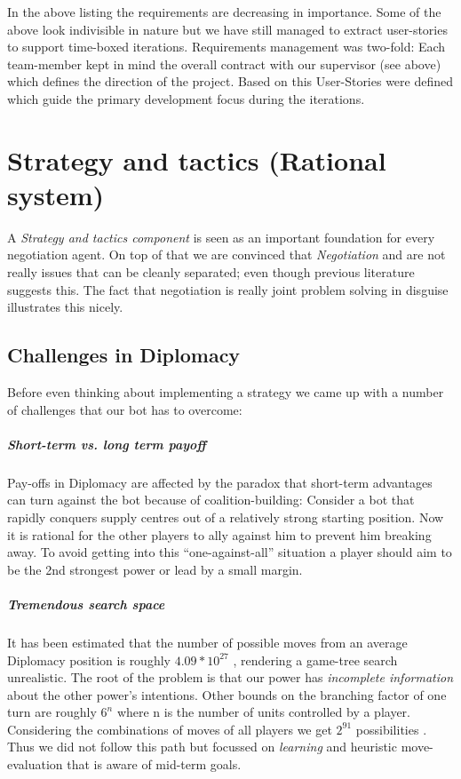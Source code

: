 \documentclass[pdftex,12pt,a4paper]{report}
\begin{document}
In the above listing the requirements are decreasing in
importance. Some of the above look indivisible in nature but we have
still managed to extract user-stories to support time-boxed
iterations. Requirements management was two-fold: Each
team-member kept in mind the overall contract with our supervisor (see
above) which defines the direction of the project.  Based on this
User-Stories were defined which guide the primary development focus
during the iterations.


\pagebreak

\chapter{Strategy and tactics (Rational system)}

A \textit{Strategy and tactics component} is seen as an important
foundation for every negotiation agent. On top of that we are 
convinced that \textit{Negotiation} and  are not
really issues that can be cleanly separated; even though previous
literature suggests this. The fact that negotiation is really
joint problem solving in disguise illustrates this nicely.

\section{Challenges in Diplomacy}

Before even thinking about implementing a strategy we came up with
a number of challenges that our bot has to overcome:

\paragraph{Short-term vs. long term payoff}
Pay-offs in Diplomacy are affected by the paradox that short-term
advantages can turn against the bot because of coalition-building:
Consider a bot that rapidly conquers supply centres out of a 
relatively strong starting position. Now it is rational for the
other players to ally against him to prevent him breaking away.
To avoid getting into this ``one-against-all'' situation a player
should aim to be the 2nd strongest power or lead by a small margin.

\paragraph{Tremendous search space}
It has been estimated that the number of possible moves from
an average Diplomacy position is roughly $4.09 * 10^{27}$ 
\cite{Kemmerling00}, rendering a game-tree search unrealistic. The root
of the problem is that our power has \textit{incomplete information} 
about the other power's intentions. Other bounds on the branching factor
of one turn are roughly $6^{n}$ where n is the number of units controlled by a
player. Considering the combinations of moves of all players we get
$2^{91}$ possibilities \cite{Shapiro02}. Thus we did not follow this
path but focussed on \textit{learning} and heuristic move-evaluation
that is aware of mid-term goals.
\end{document}
